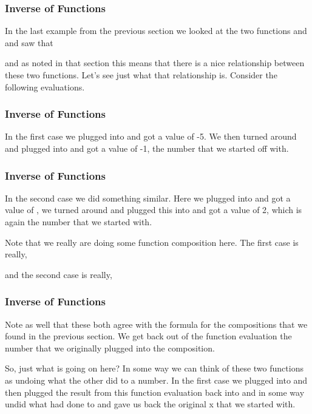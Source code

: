\documentclass{beamer}
\begin{document}
\begin{frame}[fragile]
	\frametitle{Inverse of Functions}
	\Large
In the last example from the previous section we looked at the two functions  and  and saw that


and as noted in that section this means that there is a nice relationship between these two functions.  Let’s see just what that relationship is.  Consider the following evaluations.

\end{frame}
\begin{frame}[fragile]
\frametitle{Inverse of Functions}
\Large

In the first case we plugged  into  and got a value of -5.  We then turned around and plugged  into  and got a value of -1, the number that we started off with. 
\end{frame}
\begin{frame}[fragile]
	\frametitle{Inverse of Functions}
	\Large
In the second case we did something similar.  Here we plugged  into  and got a value of , we turned around and plugged this into  and got a value of 2, which is again the number that we started with.

Note that we really are doing some function composition here.  The first case is really,

and the second case is really,


\end{frame}
\begin{frame}[fragile]
\frametitle{Inverse of Functions}
\Large
Note as well that these both agree with the formula for the compositions that we found in the previous section.  We get back out of the function evaluation the number that we originally plugged into the composition.

So, just what is going on here?  In some way we can think of these two functions as undoing what the other did to a number.  In the first case we plugged  into  and then plugged the result from this function evaluation back into  and in some way  undid what  had done to  and gave us back the original x that we started with.
\end{frame}
\end{document}
